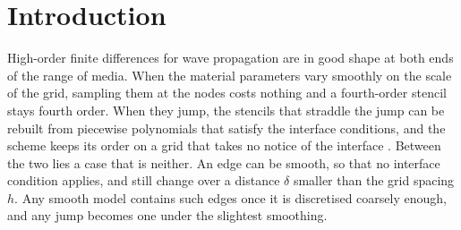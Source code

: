 \documentclass[11pt]{amsart}
\theoremstyle{definition}
\theoremstyle{remark}
\begin{document}
\maketitle

\section{Introduction}
\label{sec:intro}

High-order finite differences for wave propagation are in good shape at
both ends of the range of media. When the material parameters vary
smoothly on the scale of the grid, sampling them at the nodes costs
nothing and a fourth-order stencil stays fourth order. When they jump,
the stencils that straddle the jump can be rebuilt from piecewise
polynomials that satisfy the interface conditions, and the scheme keeps
its order on a grid that takes no notice of the interface
\cite{Martin2016,MartinFornberg2017}. Between the two lies a case that is
neither. An edge can be smooth, so that no interface condition applies,
and still change over a distance $\delta$ smaller than the grid spacing
$h$. Any smooth model contains such edges once it is discretised coarsely
enough, and any jump becomes one under the slightest smoothing.
\end{document}
